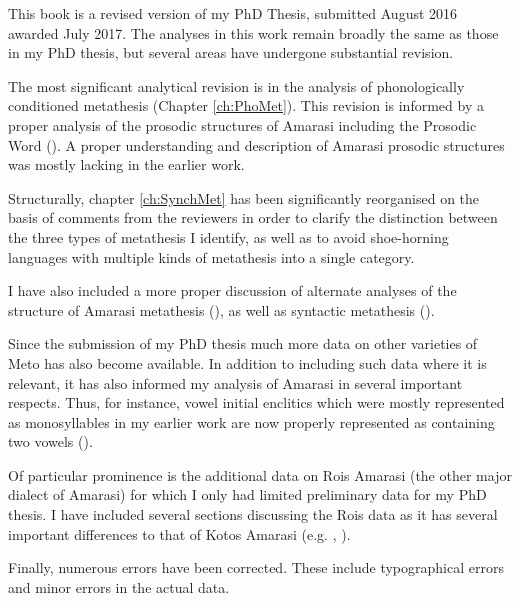 \begin{refsection}

This book is a revised version of my PhD Thesis,
submitted August 2016 awarded July 2017.
The analyses in this work remain broadly the same as those in my PhD thesis,
but several areas have undergone substantial revision.

The most significant analytical revision
is in the analysis of phonologically conditioned
metathesis (Chapter \ref{ch:PhoMet}).
This revision is informed by a proper analysis of
the prosodic structures of Amarasi including
the Prosodic Word ().
A proper understanding and description
of Amarasi prosodic structures was mostly lacking in the earlier work.

Structurally, chapter \ref{ch:SynchMet}
has been significantly reorganised on the basis
of comments from the reviewers in order to clarify
the distinction between the three types of metathesis
I identify, as well as to avoid shoe-horning languages
with multiple kinds of metathesis into a single category.

I have also included a more proper discussion
of alternate analyses of the structure of Amarasi
metathesis (), as well
as syntactic metathesis ().

Since the submission of my PhD thesis much more data
on other varieties of Meto has also become available.
In addition to including such data where it is relevant,
it has also informed my analysis of Amarasi in several important respects.
Thus, for instance, vowel initial enclitics which were mostly represented
as monosyllables in my earlier work are now properly
represented as containing two vowels ().

Of particular prominence is the additional data
on Ro{\Q}is Amarasi (the other major dialect of Amarasi)
for which I only had limited preliminary data for my PhD thesis.
I have included several sections discussing
the Ro{\Q}is data as it has several important
differences to that of Kotos Amarasi
(e.g. , ).

Finally, numerous errors have been corrected.
These include typographical errors
and minor errors in the actual data.

\end{refsection}

